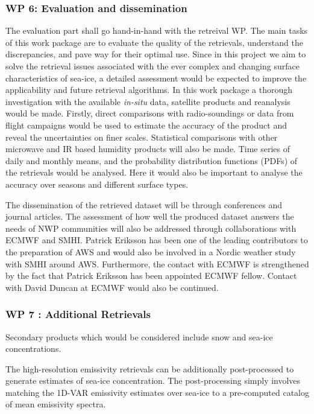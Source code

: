 \documentclass[12pt,oneside,a4paper]{article}
\begin{document}
\subsubsection*{WP 6: Evaluation and dissemination}
%
\label{sec:evaluation}
The evaluation part shall go hand-in-hand with the retreival WP. The main tasks of this work package are to evaluate the quality of the retrievals, understand the discrepancies, and pave way for their optimal use. Since in this project we aim to solve the retrieval issues associated with the ever complex and changing surface characteristics of sea-ice, a detailed assessment would be expected to improve the applicability and future retrieval algorithms. In this work package a thorough investigation with the available \textit{in-situ} data, satellite products and reanalysis would be made. Firstly, direct comparisons with radio-soundings or data from flight campaigns would be used to estimate the accuracy of the product and reveal the uncertainties on finer scales.  Statistical comparisons with other microwave and IR based humidity products  will also be made. Time series of daily and monthly means, and the probability distribution functions (PDFs) of the retrievals would be analysed. Here it would also be important to analyse the accuracy over seasons and different surface types. 

The dissemination of the retrieved dataset will be through conferences and journal articles. The assessment of how well the produced dataset answers the needs of NWP communities will also be addressed through collaborations with ECMWF and SMHI. Patrick Eriksson has been one of the leading contributors to the preparation of AWS and would also be involved in a Nordic weather study with SMHI around AWS. Furthermore, the contact with ECMWF is strengthened by the fact that Patrick Eriksson has been appointed ECMWF fellow. Contact with David Duncan at ECMWF would also be continued. 

\subsubsection*{WP 7 : Additional Retrievals}
%
\label{sec:other_retrievals}

Secondary products which would be considered include snow and sea-ice concentrations.  


The high-resolution emissivity retrievals can be additionally post-processed to generate estimates of sea-ice concentration. The post-processing simply involves matching the 1D-VAR emissivity estimates over sea-ice to a pre-computed catalog of mean emissivity spectra. 
\end{document}
